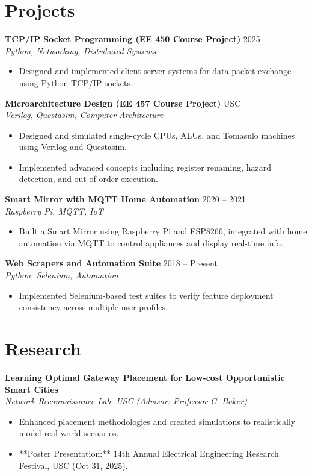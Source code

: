 \documentclass[letterpaper,10pt]{article}
\begin{document}
\section*{Projects}
\textbf{TCP/IP Socket Programming (EE 450 Course Project)} \hfill 2025 \\
\textit{Python, Networking, Distributed Systems}
\begin{itemize} \itemsep -2pt
    \item Designed and implemented client-server systems for data packet exchange using Python TCP/IP sockets.
\end{itemize}

\textbf{Microarchitecture Design (EE 457 Course Project)} \hfill USC \\
\textit{Verilog, Questasim, Computer Architecture}
\begin{itemize} \itemsep -2pt
    \item Designed and simulated single-cycle CPUs, ALUs, and Tomasulo machines using Verilog and Questasim.
    \item Implemented advanced concepts including register renaming, hazard detection, and out-of-order execution.
\end{itemize}

\textbf{Smart Mirror with MQTT Home Automation} \hfill 2020 -- 2021 \\
\textit{Raspberry Pi, MQTT, IoT}
\begin{itemize} \itemsep -2pt
    \item Built a Smart Mirror using Raspberry Pi and ESP8266, integrated with home automation via MQTT to control appliances and display real-time info.
\end{itemize}

\textbf{Web Scrapers and Automation Suite} \hfill 2018 -- Present \\
\textit{Python, Selenium, Automation}
\begin{itemize} \itemsep -2pt
    \item Implemented Selenium-based test suites to verify feature deployment consistency across multiple user profiles.
\end{itemize}

\section*{Research}
\textbf{Learning Optimal Gateway Placement for Low-cost Opportunistic Smart Cities} \\
\textit{Network Reconnaissance Lab, USC (Advisor: Professor C. Baker)}
\begin{itemize} \itemsep -2pt
    \item Enhanced placement methodologies and created simulations to realistically model real-world scenarios.
    \item **Poster Presentation:** 14th Annual Electrical Engineering Research Festival, USC (Oct 31, 2025).
\end{itemize}
\end{document}
